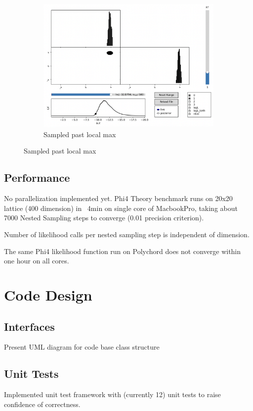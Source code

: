 \documentclass[11pt]{article}
\begin{document}
\begin{figure}[H]
\begin{subfigure}[b]{0.3\linewidth}
            \centering
            \includegraphics[width=\linewidth]{../figures/topotrap/NS3}
            \caption{Sampled past local max}
        \end{subfigure}
        \label{dig:topotrap_ns}
    \end{figure}


    \subsection{Performance}
    No parallelization implemented yet.
    Phi4 Theory benchmark runs on 20x20 lattice (400 dimension) in ~4min on single core of MacbookPro,
    taking about 7000 Nested Sampling steps to converge (0.01 precision criterion).

    Number of likelihood calls per nested sampling step is independent of dimension.

    The same Phi4 likelihood function run on Polychord does not converge within one hour on all cores.

    \newpage
    \appendix
    \section{Code Design}
    \subsection{Interfaces}
    Present UML diagram for code base class structure
    \subsection{Unit Tests}
    Implemented unit test framework with (currently 12) unit tests to raise confidence of correctness.
\end{document}
